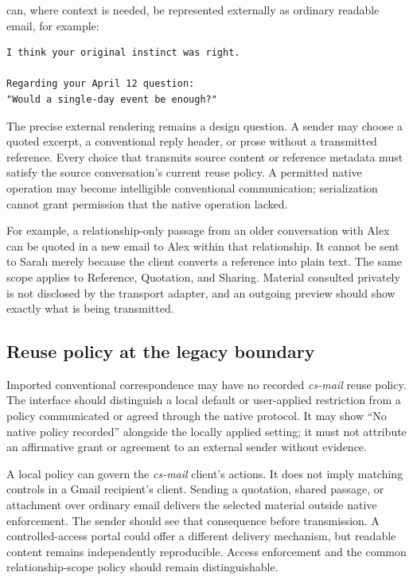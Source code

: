 \documentclass[11pt]{article}
\newcommand{\csmail}{\textit{cs-mail}}
\begin{document}
can, where context is needed, be represented externally as ordinary readable email, for example:

\begin{Verbatim}[fontsize=\small]
I think your original instinct was right.

Regarding your April 12 question:
"Would a single-day event be enough?"
\end{Verbatim}

The precise external rendering remains a design question. A sender may choose a quoted excerpt, a conventional reply header, or prose without a transmitted reference. Every choice that transmits source content or reference metadata must satisfy the source conversation's current reuse policy. A permitted native operation may become intelligible conventional communication; serialization cannot grant permission that the native operation lacked.

For example, a relationship-only passage from an older conversation with Alex can be quoted in a new email to Alex within that relationship. It cannot be sent to Sarah merely because the client converts a reference into plain text. The same scope applies to Reference, Quotation, and Sharing. Material consulted privately is not disclosed by the transport adapter, and an outgoing preview should show exactly what is being transmitted.

\subsection*{Reuse policy at the legacy boundary}

Imported conventional correspondence may have no recorded \csmail{} reuse policy. The interface should distinguish a local default or user-applied restriction from a policy communicated or agreed through the native protocol. It may show ``No native policy recorded'' alongside the locally applied setting; it must not attribute an affirmative grant or agreement to an external sender without evidence.

A local policy can govern the \csmail{} client's actions. It does not imply matching controls in a Gmail recipient's client. Sending a quotation, shared passage, or attachment over ordinary email delivers the selected material outside native enforcement. The sender should see that consequence before transmission. A controlled-access portal could offer a different delivery mechanism, but readable content remains independently reproducible. Access enforcement and the common relationship-scope policy should remain distinguishable.
\end{document}
